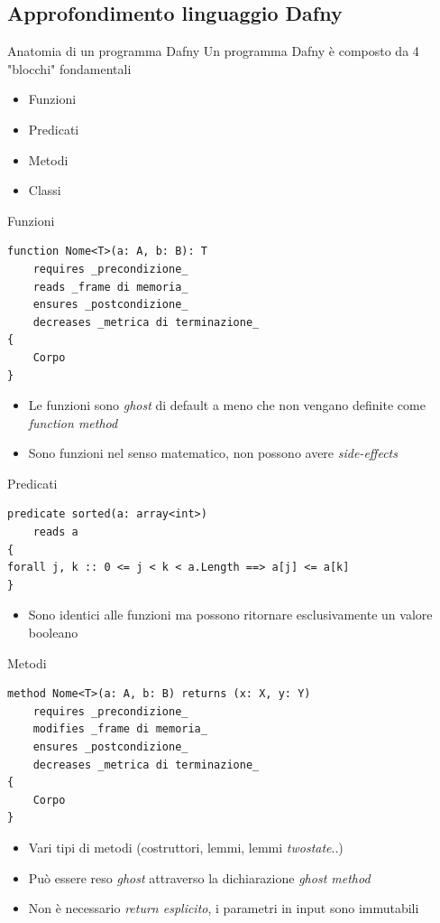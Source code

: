 \documentclass[]{beamer}
\begin{document}
\subsection{Approfondimento linguaggio Dafny}
\begin{frame}{Anatomia di un programma Dafny}
    Un programma Dafny è composto da 4 "blocchi" fondamentali \cite{Dafny_ref_manual}
    \begin{itemize}
        \item Funzioni
        \item Predicati
        \item Metodi
        \item Classi
    \end{itemize}
\end{frame}

\begin{frame}[containsverbatim]{Funzioni}
\lstset{linewidth=11cm}
\begin{lstlisting}
function Nome<T>(a: A, b: B): T
    requires _precondizione_
    reads _frame di memoria_
    ensures _postcondizione_
    decreases _metrica di terminazione_
{
    Corpo
}
\end{lstlisting}
\begin{itemize}
    \item Le funzioni sono \textit{ghost} di default a meno che non vengano definite come \textit{function method}
    \item Sono funzioni nel senso matematico, non possono avere \textit{side-effects}
\end{itemize}
\end{frame}

\begin{frame}[containsverbatim]{Predicati}
\lstset{linewidth=11cm}
\begin{lstlisting}
predicate sorted(a: array<int>)
    reads a
{
forall j, k :: 0 <= j < k < a.Length ==> a[j] <= a[k]
}
\end{lstlisting} 
\begin{itemize}
    \item Sono identici alle funzioni ma possono ritornare esclusivamente un valore booleano
\end{itemize}
\end{frame}

\begin{frame}[containsverbatim]{Metodi}
\lstset{linewidth=11cm}
\begin{lstlisting}
method Nome<T>(a: A, b: B) returns (x: X, y: Y)
    requires _precondizione_
    modifies _frame di memoria_
    ensures _postcondizione_
    decreases _metrica di terminazione_
{
    Corpo
}
\end{lstlisting}   
\begin{itemize}
    \item Vari tipi di metodi (costruttori, lemmi, lemmi \textit{twostate}..)
    \item Può essere reso \textit{ghost} attraverso la dichiarazione \textit{ghost method}
    \item Non è necessario \textit{return esplicito}, i parametri in input sono immutabili
\end{itemize}
\end{frame}
\end{document}
